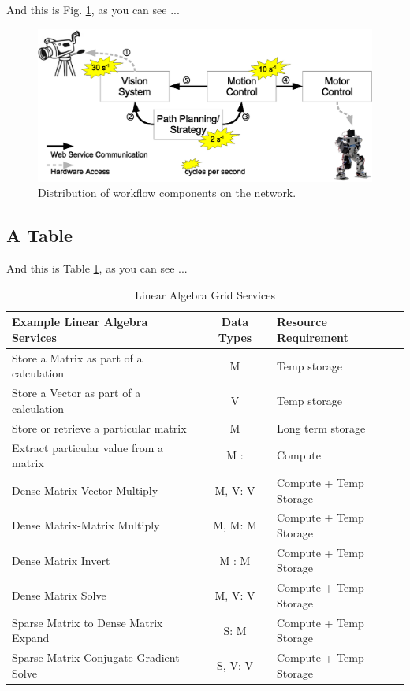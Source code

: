\documentclass[a4paper,twoside]{arlims}
\begin{document}
And this is Fig. \ref{fig:timing}, as you can see ...

\begin{figure}[hbt]
  \centering
  \includegraphics[width=.75\hsize]{timing}
  \caption{Distribution of workflow components on the network.}
  \label{fig:timing}
\end{figure}


\subsection{A Table}
\label{subsect:Table}

And this is Table \ref{tab:LINALG}, as you can see ...

\begin{table}[htbp]
  \caption{Linear Algebra Grid Services}
  \centering
  \begin{tabular}{|l|c|l|}
    \hline
    \textbf{Example Linear Algebra Services} & \textbf{Data Types} & \textbf{Resource Requirement} \\
    \hline
    Store a Matrix as part of a calculation  & M          &   Temp storage            \\
    Store a Vector as part of a calculation  & V          &   Temp storage            \\
    Store or retrieve a particular matrix    & M          &   Long term storage       \\
    Extract particular value from a matrix   & M :        &   Compute                 \\
    Dense Matrix-Vector Multiply             & M, V: V    &   Compute + Temp Storage  \\
    Dense Matrix-Matrix Multiply             & M, M: M    &   Compute + Temp Storage  \\
    Dense Matrix Invert                      & M : M      &   Compute + Temp Storage  \\
    Dense Matrix Solve                       & M, V: V    &   Compute + Temp Storage  \\
    Sparse Matrix to Dense Matrix Expand     & S: M       &   Compute + Temp Storage  \\
    Sparse Matrix Conjugate Gradient Solve   & S, V: V    &   Compute + Temp Storage  \\
    \hline
  \end{tabular}
  \label{tab:LINALG}
\end{table}
\end{document}
